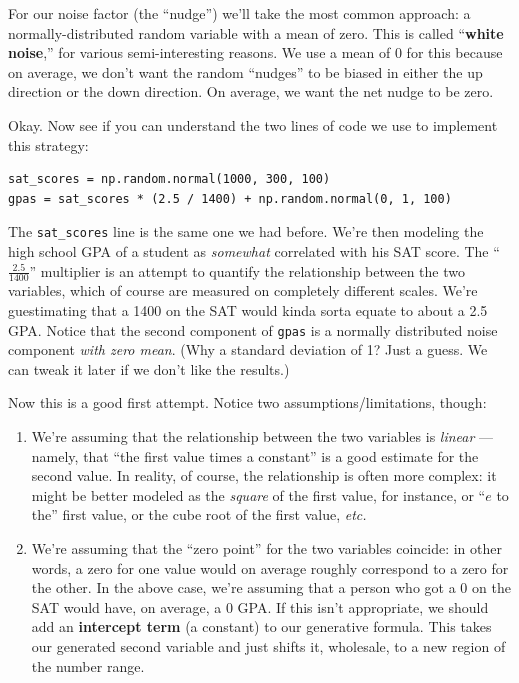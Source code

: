 
For our noise factor (the ``nudge'') we'll take the most common approach: a
normally-distributed random variable with a mean of zero. This is called
``\textbf{white noise},'' for various semi-interesting reasons. We use a mean
of 0 for this because on average, we don't want the random ``nudges'' to be
biased in either the up direction or the down direction. On average, we want
the net nudge to be zero.

Okay. Now see if you can understand the two lines of code we use to implement
this strategy:


\begin{Verbatim}[fontsize=\footnotesize,samepage=true,frame=single,framesep=3mm]
sat_scores = np.random.normal(1000, 300, 100)
gpas = sat_scores * (2.5 / 1400) + np.random.normal(0, 1, 100)
\end{Verbatim}

The \texttt{sat\_scores} line is the same one we had before. We're then
modeling the high school GPA of a student as \textit{somewhat} correlated with
his SAT score. The ``$\frac{2.5}{1400}$'' multiplier is an attempt to quantify
the relationship between the two variables, which of course are measured on
completely different scales. We're guestimating that a 1400 on the SAT would
kinda sorta equate to about a 2.5 GPA. Notice that the second component of
\texttt{gpas} is a normally distributed noise component \textit{with zero
mean}. (Why a standard deviation of 1? Just a guess. We can tweak it later if
we don't like the results.)

Now this is a good first attempt. Notice two assumptions/limitations, though:

\begin{enumerate}

\item We're assuming that the relationship between the two variables is
\textit{linear} --- namely, that ``the first value times a constant'' is a good
estimate for the second value. In reality, of course, the relationship is often
more complex: it might be better modeled as the \textit{square} of the first
value, for instance, or ``$e$ to the'' first value, or the cube root of the
first value, \textit{etc.}


\item We're assuming that the ``zero point'' for the two variables coincide: in
other words, a zero for one value would on average roughly correspond to a zero
for the other. In the above case, we're assuming that a person who got a 0 on
the SAT would have, on average, a 0 GPA. If this isn't appropriate, we should
add an \textbf{intercept term} (a constant) to our generative formula. This
takes our generated second variable and just shifts it, wholesale, to a new
region of the number range.

\end{enumerate}

